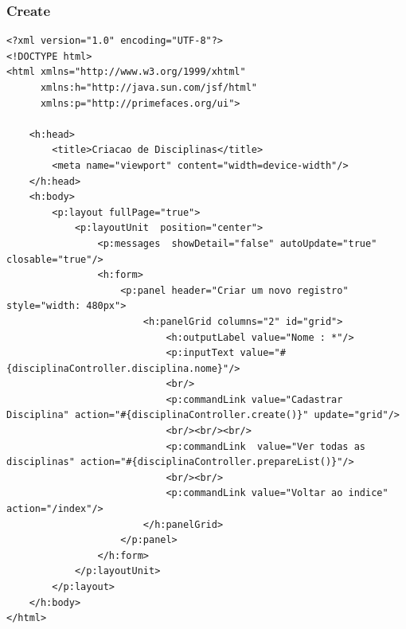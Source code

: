 \documentclass[12pt,a4paper]{article}
\begin{document}
\subsubsection{Create}
\label{subsubsectionDisciplinaCreate}
\begin{lstlisting}
<?xml version="1.0" encoding="UTF-8"?>
<!DOCTYPE html>
<html xmlns="http://www.w3.org/1999/xhtml"
      xmlns:h="http://java.sun.com/jsf/html"
      xmlns:p="http://primefaces.org/ui">

    <h:head>
        <title>Criacao de Disciplinas</title>
        <meta name="viewport" content="width=device-width"/>
    </h:head>
    <h:body>
        <p:layout fullPage="true"> 
            <p:layoutUnit  position="center">
                <p:messages  showDetail="false" autoUpdate="true" closable="true"/>
                <h:form>
                    <p:panel header="Criar um novo registro" style="width: 480px">  
                        <h:panelGrid columns="2" id="grid">  
                            <h:outputLabel value="Nome : *"/>  
                            <p:inputText value="#{disciplinaController.disciplina.nome}"/>
                            <br/>
                            <p:commandLink value="Cadastrar Disciplina" action="#{disciplinaController.create()}" update="grid"/>
                            <br/><br/><br/>
                            <p:commandLink  value="Ver todas as disciplinas" action="#{disciplinaController.prepareList()}"/>
                            <br/><br/>
                            <p:commandLink value="Voltar ao indice" action="/index"/>
                        </h:panelGrid>
                    </p:panel>
                </h:form>
            </p:layoutUnit>
        </p:layout>
    </h:body>
</html>
\end{lstlisting}
\end{document}
